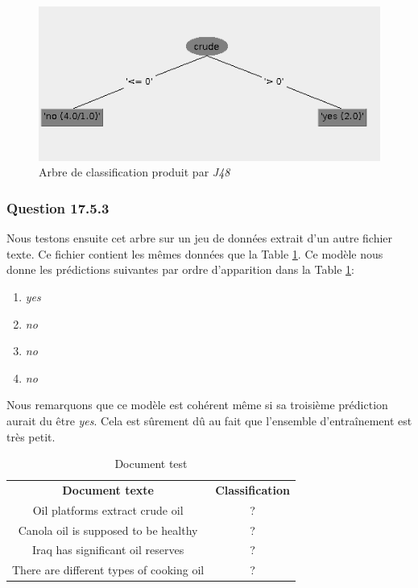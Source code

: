 \documentclass[11pt,a4paper]{article}
\begin{document}
			\begin{figure}[h]
				\centering
				\includegraphics[width=.7\textwidth]{text_tree}
				\caption{Arbre de classification produit par \textit{J48}}
				\label{fig:text:training:tree}
			\end{figure}
			 
			\subsubsection*{Question 17.5.3}
			
			Nous testons ensuite cet arbre sur un jeu de données extrait d'un autre fichier texte. Ce fichier contient les mêmes données que la Table \ref{tab:oil:test}. Ce modèle nous donne les prédictions suivantes par ordre d'apparition dans la Table \ref{tab:oil:test}:
			
			\begin{enumerate}
				\item \textit{yes}      
				\item \textit{no}
				\item \textit{no}
				\item \textit{no}  
			\end{enumerate}
			
			Nous remarquons que ce modèle est cohérent même si sa troisième prédiction aurait du être \textit{yes}. Cela est sûrement dû au fait que l'ensemble d'entraînement est très petit.
			
			\begin{table}[h]
				\centering
				\caption{Document test}
				\label{tab:oil:test}
				\begin{tabular}{|c c|}
					\hline
					\textbf{Document texte} & \textbf{Classification}\\
					Oil platforms extract crude oil & ?\\
					Canola oil is supposed to be healthy & ?\\
					Iraq has significant oil reserves & ?\\
					There are different types of cooking oil & ?\\
					\hline
				\end{tabular}
			\end{table}
			
\end{document}
